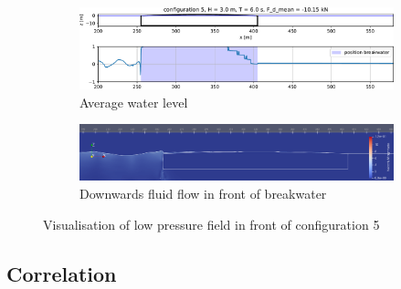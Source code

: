 \begin{figure}[h]
    \centering
    \begin{subfigure}[b]{0.49\textwidth}
        \centering
        \includegraphics[width=\linewidth]{figures/ComFLOW/Results average wl/configuration5.pdf}
        \caption[]%
        {{\small Average water level}}    
        \label{fig: average wl configuration 5}
    \end{subfigure}
    \hfill
    \begin{subfigure}[b]{0.49\textwidth}  
        \centering 
        \includegraphics[width=\linewidth]{figures/ComFLOW/Results DI1/config_5_run_23.png}
        \caption[]%
        {{\small Downwards fluid flow in front of breakwater}}    
        \label{fig: fluid flow configuration 5}
    \end{subfigure}
    
    \caption{Visualisation of low pressure field in front of configuration 5}
    \label{fig: configuration 5 low pressure field }
\end{figure}





\subsection{Correlation}
\label{sec: DI1 captive H3 correlation}


